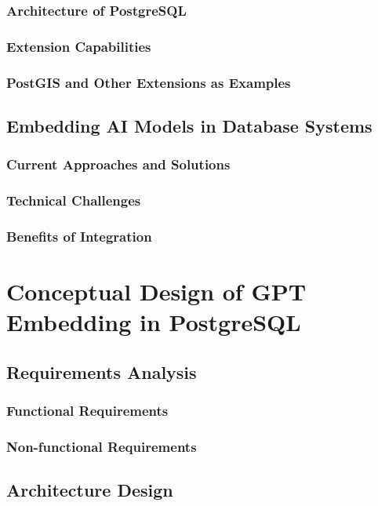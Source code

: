 \documentclass{article}
\begin{document}
\subsubsection{Architecture of PostgreSQL}
\subsubsection{Extension Capabilities}
\subsubsection{PostGIS and Other Extensions as Examples}

\subsection{Embedding AI Models in Database Systems}
\subsubsection{Current Approaches and Solutions}
\subsubsection{Technical Challenges}
\subsubsection{Benefits of Integration}

\newpage

\section{Conceptual Design of GPT Embedding in PostgreSQL}

\subsection{Requirements Analysis}
\subsubsection{Functional Requirements}
\subsubsection{Non-functional Requirements}

\subsection{Architecture Design}
\end{document}
